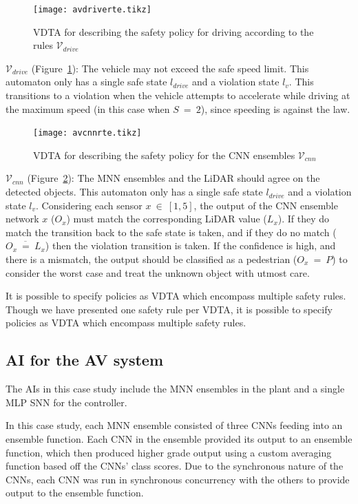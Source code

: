 \begin{figure}[h]
	\centering
	\texttt{[image: avdriverte.tikz]}
	\caption{\ac{VDTA} for describing the safety policy for driving according to the rules $\mathcal{V}_{drive}$\label{fig:avdriverte}}
\end{figure}

$\mathcal{V}_{drive}$ (Figure~\ref{fig:avdriverte}): The vehicle may not exceed the safe speed limit. 
This automaton only has a single safe state $l_{drive}$ and a violation state $l_v$.
This transitions to a violation when the vehicle attempts to accelerate while driving at the maximum speed (in this case when $S~=~2$), since speeding is against the law.

\begin{figure}[h]
	\centering
	\texttt{[image: avcnnrte.tikz]}
	\caption{\ac{VDTA} for describing the safety policy for the \ac{CNN} ensembles $\mathcal{V}_{cnn}$\label{fig:avcnnrte}}
\end{figure}

$\mathcal{V}_{cnn}$ (Figure~\ref{fig:avcnnrte}): The \ac{MNN} ensembles and the \ac{LiDAR} should agree on the detected objects.
This automaton only has a single safe state $l_{drive}$ and a violation state $l_v$.
Considering each sensor $x~\in~[1,5]$, the output of the \ac{CNN} ensemble network $x$ ($O_x$) must match the corresponding \ac{LiDAR} value ($L_x$).
If they do match the transition back to the safe state is taken, and if they do no match ($\overline{O_x~=~L_x}$) then the violation transition is taken.
If the confidence is high, and there is a mismatch, the output should be classified as a pedestrian ($O_x~=~P$) to consider the worst case and treat the unknown object with utmost care.

It is possible to specify policies as \ac{VDTA} which encompass multiple safety rules.
Though we have presented one safety rule per \ac{VDTA}, it is possible to specify policies as \ac{VDTA} which encompass multiple safety rules.

\subsection{\acf{AI} for the \acf{AV} system}
The \acp{AI} in this case study include the \ac{MNN} ensembles in the plant and a single \ac{MLP} \ac{SNN} for the controller.

In this case study, each \ac{MNN} ensemble consisted of three \acp{CNN} feeding into an ensemble function.
Each \ac{CNN} in the ensemble provided its output to an ensemble function, which then produced higher grade output using a custom averaging function based off the \acp{CNN}' class scores.
Due to the synchronous nature of the \acp{CNN}, each \ac{CNN} was run in synchronous concurrency with the others to provide output to the ensemble function.
	
